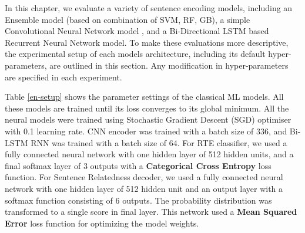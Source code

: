 \documentclass[12pt]{report} %
\begin{document}
 In this chapter, we evaluate a variety of sentence encoding models,
 including an Ensemble model (based on combination of SVM, RF, GB), a simple Convolutional Neural Network model , and a Bi-Directional LSTM based Recurrent Neural Network model. To make these evaluations more descriptive, the experimental setup of each models architecture, including its default hyper-parameters, are outlined in this section. Any modification in hyper-parameters are specified in each experiment.
 
 Table \ref{en-setup} shows the parameter settings of the classical ML models. All these models are trained until its loss converges to its global minimum. All the neural models were trained using Stochastic Gradient Descent (SGD) optimiser with 0.1 learning rate. CNN encoder was trained with a batch size of 336, and Bi-LSTM RNN was trained with a batch size of 64. For RTE classifier,  we used a fully connected neural network with one hidden layer of 512 hidden units, and a final softmax layer of 3 outputs with a \textbf{Categorical Cross Entropy} loss function. For Sentence Relatedness decoder, we used a fully connected neural network with one hidden layer of 512 hidden unit and an output layer with a softmax function consisting of 6 outputs. The probability distribution was transformed to a single score in final layer. This network used a \textbf{Mean Squared Error} loss function for optimizing the model weights. 
\end{document}
